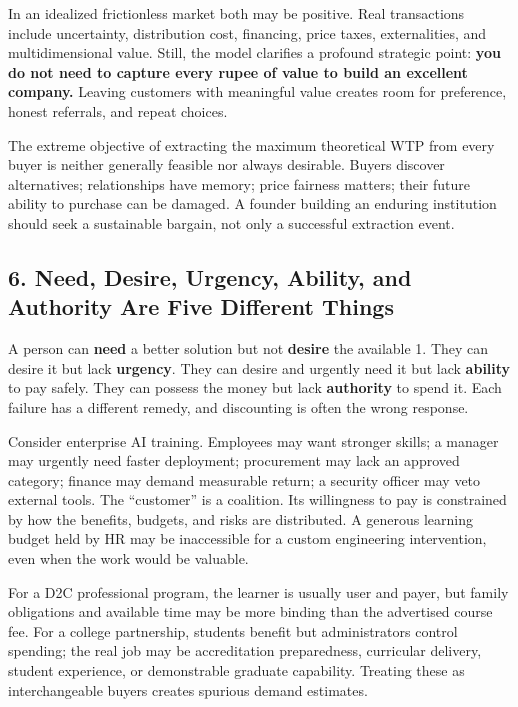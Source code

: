 In an idealized frictionless market both may be positive. Real transactions include uncertainty, distribution cost, financing, price taxes, externalities, and multidimensional value. Still, the model clarifies a profound strategic point: \textbf{you do not need to capture every rupee of value to build an excellent company.} Leaving customers with meaningful value creates room for preference, honest referrals, and repeat choices.

The extreme objective of extracting the maximum theoretical WTP from every buyer is neither generally feasible nor always desirable. Buyers discover alternatives; relationships have memory; price fairness matters; their future ability to purchase can be damaged. A founder building an enduring institution should seek a sustainable bargain, not only a successful extraction event.

\subsection*{6. Need, Desire, Urgency, Ability, and Authority Are Five Different Things}

A person can \textbf{need} a better solution but not \textbf{desire} the available 1. They can desire it but lack \textbf{urgency}. They can desire and urgently need it but lack \textbf{ability} to pay safely. They can possess the money but lack \textbf{authority} to spend it. Each failure has a different remedy, and discounting is often the wrong response.

Consider enterprise AI training. Employees may want stronger skills; a manager may urgently need faster deployment; procurement may lack an approved category; finance may demand measurable return; a security officer may veto external tools. The ``customer'' is a coalition. Its willingness to pay is constrained by how the benefits, budgets, and risks are distributed. A generous learning budget held by HR may be inaccessible for a custom engineering intervention, even when the work would be valuable.

For a D2C professional program, the learner is usually user and payer, but family obligations and available time may be more binding than the advertised course fee. For a college partnership, students benefit but administrators control spending; the real job may be accreditation preparedness, curricular delivery, student experience, or demonstrable graduate capability. Treating these as interchangeable buyers creates spurious demand estimates.

